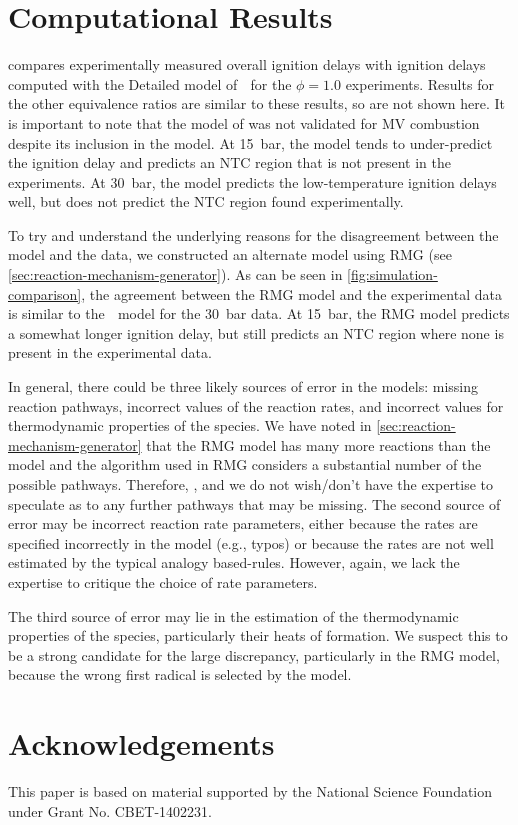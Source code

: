 \documentclass[12pt]{../ussci}
\begin{document}
\section{Computational Results}\label{sec:computational-results}

 compares experimentally measured overall
ignition delays with ignition delays computed with the Detailed model of
\textcite{Dievart2013} for the $\phi=1.0$ experiments. Results for the other
equivalence ratios are similar to these results, so are not shown here. It is
important to note that the model of \textcite{Dievart2013} was not validated for
MV combustion despite its inclusion in the model. At \SI{15}{\bar}, the model
tends to under-predict the ignition delay and predicts an NTC region that is not
present in the experiments. At \SI{30}{\bar}, the model predicts the
low-temperature ignition delays well, but does not predict the NTC region found
experimentally.

To try and understand the underlying reasons for the disagreement between the \textcite{Dievart2013} model and the data, we constructed an alternate model using RMG (see \cref{sec:reaction-mechanism-generator}). As can be seen in \cref{fig:simulation-comparison}, the agreement between the RMG model and the experimental data is similar to the \textcite{Dievart2013} model for the \SI{30}{\bar} data. At \SI{15}{\bar}, the RMG model predicts a somewhat longer ignition delay, but still predicts an NTC region where none is present in the experimental data.

In general, there could be three likely sources of error in the models: missing reaction pathways, incorrect values of the reaction rates, and incorrect values for thermodynamic properties of the species. We have noted in \cref{sec:reaction-mechanism-generator} that the RMG model has many more reactions than the \textcite{Dievart2013} model and the algorithm used in RMG considers a substantial number of the possible pathways. Therefore, , and we do not wish/don’t have the expertise to speculate as to any further pathways that may be missing. The second source of error may be incorrect reaction rate parameters, either because the rates are specified incorrectly in the model (e.g., typos) or because the rates are not well estimated by the typical analogy based-rules. However, again, we lack the expertise to critique the choice of rate parameters.

The third source of error may lie in the estimation of the thermodynamic properties of the species, particularly their heats of formation. We suspect this to be a strong candidate for the large discrepancy, particularly in the RMG model, because the wrong first radical is selected by the model.

\section{Acknowledgements}\label{sec:acknowledgements}

This paper is based on material supported by the National Science
Foundation under Grant No. CBET-1402231.

\printbibliography
\end{document}
